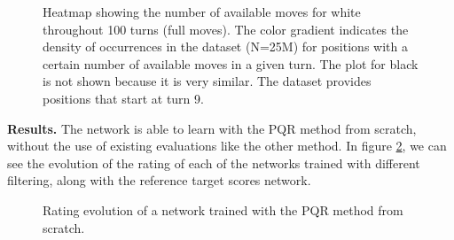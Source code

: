 \begin{figure}[H]
\centering
{}
\caption{Heatmap showing the number of available moves for white throughout 100 turns (full moves). The color gradient indicates the density of occurrences in the dataset (N=25M) for positions with a certain number of available moves in a given turn. The plot for black is not shown because it is very similar. The dataset provides positions that start at turn 9.}
\label{avg-moves}
\end{figure}

\textbf{Results.} The network is able to learn with the PQR method from scratch, without the use of existing evaluations like the other method. In figure \ref{pqr1-evolution}, we can see the evolution of the rating of each of the networks trained with different filtering, along with the reference target scores network.


\begin{figure}[H]
\centering
{}
\caption{Rating evolution of a network trained with the PQR method from scratch.}
\label{pqr1-evolution}
\end{figure}

